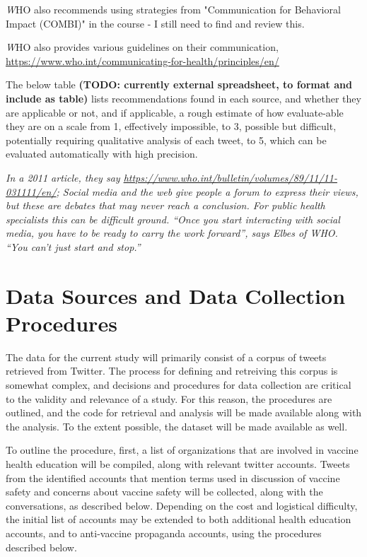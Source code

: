 \documentclass{article}
\begin{document}
{\textit WHO also recommends using strategies from "Communication for Behavioral Impact (COMBI)" in the course - I still need to find and review this.}

 { \textit WHO also provides various guidelines on their communication\cite{WHOWebHealthComm},  \url{https://www.who.int/communicating-for-health/principles/en/} }

The below table \textbf{(TODO: currently external spreadsheet, to format and include as table)} lists recommendations found in each source, and whether they are applicable or not, and if applicable, a rough estimate of how evaluate-able they are on a scale from 1, effectively impossible, to 3, possible but difficult, potentially requiring qualitative analysis of each tweet, to 5, which can be evaluated automatically with high precision.

\textit{In a 2011 article, they say \url{https://www.who.int/bulletin/volumes/89/11/11-031111/en/};
Social media and the web give people a forum to express their views, but these are debates that may never reach a conclusion. For public health specialists this can be difficult ground. “Once you start interacting with social media, you have to be ready to carry the work forward”, says Elbes of WHO. “You can't just start and stop.”}

\section{Data Sources and Data Collection Procedures}

The data for the current study will primarily consist of a corpus of tweets retrieved from Twitter. The process for defining and retreiving this corpus is somewhat complex, and decisions and procedures for data collection are critical to the validity and relevance of a study. For this reason, the procedures are outlined, and the code for retrieval and analysis will be made available along with the analysis. To the extent possible, the dataset will be made available as well.

To outline the procedure, first, a list of organizations that are involved in vaccine health education will be compiled, along with relevant twitter accounts.  Tweets from the identified accounts that mention terms used in discussion of vaccine safety and concerns about vaccine safety will be collected, along with the conversations, as described below. Depending on the cost and logistical difficulty, the initial list of accounts may be extended to both additional health education accounts, and to anti-vaccine propaganda accounts, using the procedures described below.
\end{document}
